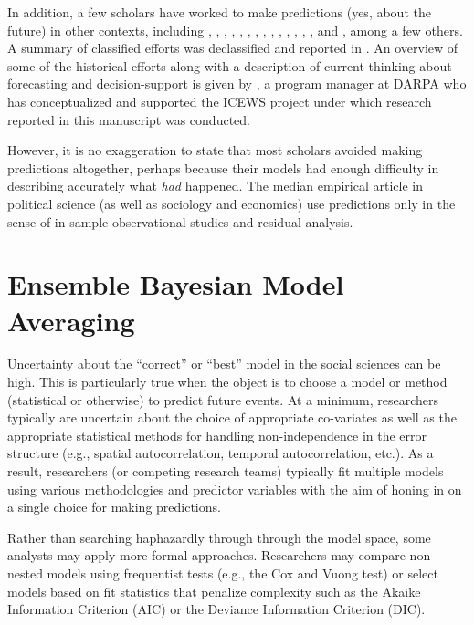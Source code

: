 \documentclass[pdftex,12pt,fullpage,oneside]{amsart}
\begin{document}
In addition, a few scholars have worked to make predictions (yes,
about the future) in other contexts, including
\citet{Krause:1997}, \citet{Davies:Gurr:1998},
\citet{Pevehouse:Goldstein:1999}, \citet{Schrodt:Gerner:2000},
\citet{King:Zeng:2001}, \citet{OBrien:2002}, \citet{BDM:2002},
\citet{Fearon:Laitin:2003}, \citet{Demarchi:etal:2004},
\citet{Enders:Sandler:2005}, \citet{Leblang:Satyanath:2006},
\citet{Ward:etal:2007}, \citet{Brandt:etal:2008},
\citet{Bennett:Stam:2009}, and \citet{Gleditsch:Ward:2010}, among a
few others. A summary of classified efforts was declassified and
reported in \citet{Feder:2002}. An overview of some of the historical
efforts along with a description of current thinking about forecasting
and decision-support is given by \citet{OBrien:2010}, a program
manager at DARPA who has conceptualized and supported the ICEWS
project under which research reported in this manuscript was
conducted.

However, it is no exaggeration to state that most scholars avoided
making predictions altogether, perhaps because their models had enough
difficulty in describing accurately what \emph{had} happened.  The
median empirical article in political science (as well as sociology
and economics) use predictions only in the sense of in-sample
observational studies and residual analysis.


\section{Ensemble Bayesian Model Averaging} 

Uncertainty about the ``correct'' or ``best'' model in the social
sciences can be high. This is particularly true when the object is to
choose a model or method (statistical or otherwise) to predict future
events. At a minimum, researchers typically are uncertain about the
choice of appropriate co-variates as well as the
appropriate statistical methods for handling non-independence in the
error structure (e.g., spatial autocorrelation, temporal
autocorrelation, etc.). As a result, researchers (or competing
research teams) typically fit multiple models using various
methodologies and predictor variables with the aim of honing in on a
single choice for making predictions.

Rather than searching haphazardly through through the model space,
some analysts may apply more formal approaches. Researchers may
compare non-nested models using frequentist tests (e.g., the Cox and
Vuong test) or select models based on fit statistics that penalize
complexity such as the Akaike Information Criterion (AIC) or the
Deviance Information Criterion (DIC).
\end{document}
